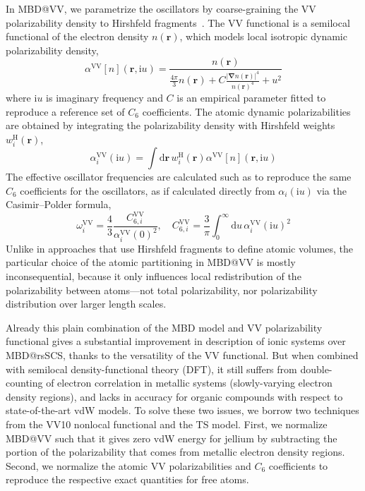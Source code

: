 In MBD@VV, we parametrize the oscillators by coarse-graining the VV polarizability density to Hirshfeld fragments~\citep{HirshfeldTCA77,SatoJCP09,SatoJCP10}.
The VV functional is a semilocal functional of the electron density $n(\mathbf r)$, which models local isotropic dynamic polarizability density,
\begin{equation}
   \alpha^\text{VV}[n](\mathbf r,\mathrm iu)=\frac{n(\mathbf r)}{\frac{4\pi}3n(\mathbf r)+C\frac{{|\boldsymbol\nabla n(\mathbf r)|}^4}{n{(\mathbf r)}^4}+u^2}
   \label{eq:vv-functional}
\end{equation}
where $\mathrm iu$ is imaginary frequency and $C$ is an empirical parameter fitted to reproduce a reference set of $C_6$ coefficients.
The atomic dynamic polarizabilities are obtained by integrating the polarizability density with Hirshfeld weights $w_i^\text{H}(\mathbf r)$,
\begin{equation}
  \alpha_i^\text{VV}(\mathrm iu)=\int\mathrm d\mathbf r\,w_i^\text{H}(\mathbf r)\alpha^\text{VV}[n](\mathbf r,\mathrm iu)
\end{equation}
The effective oscillator frequencies are calculated such as to reproduce the same $C_6$ coefficients for the oscillators, as if calculated directly from $\alpha_i(\mathrm iu)$ via the Casimir--Polder formula,
\begin{equation}
  \omega_i^\text{VV}=\frac43\frac{C_{6,i}^\text{VV}}{\alpha_i^\text{VV}{(0)}^2},\quad
  C_{6,i}^\text{VV}=\frac3\pi\int_0^\infty\mathrm du\,\alpha_i^\text{VV}{(\mathrm iu)}^2
\end{equation}
Unlike in approaches that use Hirshfeld fragments to define atomic volumes, the particular choice of the atomic partitioning in MBD@VV is mostly inconsequential, because it only influences local redistribution of the polarizability between atoms---not total polarizability, nor polarizability distribution over larger length scales.

Already this plain combination of the MBD model and VV polarizability functional gives a substantial improvement in description of ionic systems over MBD@rsSCS, thanks to the versatility of the VV functional.
But when combined with semilocal density-functional theory (DFT), it still suffers from double-counting of electron correlation in metallic systems (slowly-varying electron density regions), and lacks in accuracy for organic compounds with respect to state-of-the-art vdW models.
To solve these two issues, we borrow two techniques from the VV10 nonlocal functional and the TS model.
First, we normalize MBD@VV such that it gives zero vdW energy for jellium by subtracting the portion of the polarizability that comes from metallic electron density regions.
Second, we normalize the atomic VV polarizabilities and $C_6$ coefficients to reproduce the respective exact quantities for free atoms.

